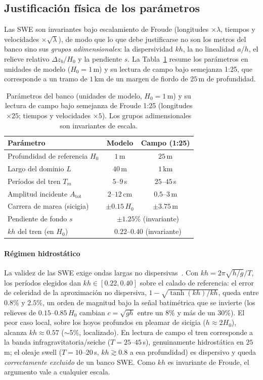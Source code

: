\documentclass[conference]{IEEEtran}
\newcommand{\zb}{z_b}
\begin{document}
\subsection{Justificación física de los parámetros}
\label{sec:fisica}
Las SWE son invariantes bajo escalamiento de Froude (longitudes $\times\lambda$,
tiempos y velocidades $\times\sqrt{\lambda}$), de modo que lo que debe
justificarse no son los metros del banco sino sus \emph{grupos adimensionales}:
la dispersividad $kh$, la no linealidad $a/h$, el relieve relativo
$\Delta\zb/H_0$ y la pendiente $s$. La Tabla~\ref{tab:froude} resume los
parámetros en unidades de modelo ($H_0=1$\,m) y su lectura de campo bajo
semejanza 1:25, que corresponde a un tramo de $1$\,km de un margen de fiordo de
$25$\,m de profundidad.

\begin{table}[t]
\centering
\caption{Parámetros del banco (unidades de modelo, $H_0=1$\,m) y su lectura de
campo bajo semejanza de Froude 1:25 (longitudes $\times 25$; tiempos y
velocidades $\times 5$). Los grupos adimensionales son invariantes de escala.}
\label{tab:froude}
\begin{tabular}{lcc}
\toprule
Parámetro & Modelo & Campo (1:25) \\
\midrule
Profundidad de referencia $H_0$ & $1$\,m & $25$\,m \\
Largo del dominio $L$ & $40$\,m & $1$\,km \\
Períodos del tren $T_m$ & $5$--$9$\,s & $25$--$45$\,s \\
Amplitud incidente $A_{\text{tot}}$ & $2$--$12$\,cm & $0.5$--$3$\,m \\
Carrera de marea (sicigia) & $\pm0.15\,H_0$ & $\pm3.75$\,m \\
Pendiente de fondo $s$ & \multicolumn{2}{c}{$\pm1.25\%$ (invariante)} \\
$kh$ del tren (en $H_0$) & \multicolumn{2}{c}{$0.22$--$0.40$ (invariante)} \\
\bottomrule
\end{tabular}
\end{table}

\paragraph{Régimen hidrostático}
La validez de las SWE exige ondas largas no dispersivas~\cite{vreugdenhil1994,
vallis2017}. Con $kh = 2\pi\sqrt{h/g}/T$, los períodos elegidos dan
$kh\in[0.22,0.40]$ sobre el calado de referencia: el error de celeridad de la
aproximación no dispersiva, $1-\sqrt{\tanh(kh)/kh}$, queda entre $0.8\%$ y
$2.5\%$, un orden de magnitud bajo la señal batimétrica que se invierte (los
relieves de $0.15$--$0.85\,H_0$ cambian $c=\sqrt{gh}$ entre un $8\%$ y más de un
$30\%$). El peor caso local, sobre los hoyos profundos en pleamar de sicigia
($h\approx 2H_0$), alcanza $kh\approx0.57$ ($\sim$5\%, localizado). En lectura
de campo el tren corresponde a la banda infragravitatoria/seiche
($T=25$--$45$\,s), genuinamente hidrostática en $25$\,m; el oleaje swell
($T=10$--$20$\,s, $kh\gtrsim0.8$ a esa profundidad) es dispersivo y queda
\emph{correctamente excluido} de un banco SWE. Como $kh$ es invariante de
Froude, el argumento vale a cualquier escala.
\end{document}
